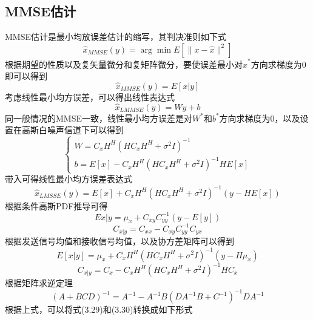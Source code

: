 \documentclass[bachelor,nocolorlinks, printoneside]{seuthesis} %
\begin{document}
\begin{Main}
\section{MMSE估计}
MMSE估计是最小均放误差估计的缩写，其判决准则如下式
\begin{equation}\label{key}
\hat{x}_{MMSE}(y) = \arg \min E[\| x - \hat{x} \|^{2}]
\end{equation}
根据期望的性质以及复矢量微分和复矩阵微分，要使误差最小对$\hat{x}^{*}$方向求梯度为0即可以得到
\begin{equation}\label{key}
\hat{x}_{MMSE}(y) = E[x|y]
\end{equation}
考虑线性最小均方误差，可以得出线性表达式
\begin{equation}\label{key}
\hat{x}_{LMMSE}(y)=Wy+b
\end{equation}
同一般情况的MMSE一致，线性最小均方误差是对$W^{*}$和$b^{*}$方向求梯度为0，以及设置在高斯白噪声信道下可以得到
\begin{equation}\label{key}
\left\{
\begin{array}{l}
W=C_{x}H^{H}(HC_{x}H^{H} + \sigma^{2}I)^{-1} \\
b=E[x] - C_{x}H^{H}(HC_{x}H^{H} + \sigma^{2}I)^{-1}HE[x]
\end{array}
\right.
\end{equation}
带入可得线性最小均方误差表达式
\begin{equation}\label{key}
\hat{x}_{LMSSE}(y)=E[x]+C_{x}H^{H}(HC_{x}H^{H}+\sigma^{2}I)^{-1}(y-HE[x])
\end{equation}
根据条件高斯PDF推导可得
\begin{equation}\label{key}
E{x|y}=\mu_{x}+C_{xy}C_{yy}^{-1}(y-E[y])
\end{equation}
\begin{equation}\label{key}
C_{x|y} = C_{xx} -C_{xy}C_{yy}^{-1}C_{yx}
\end{equation}
根据发送信号均值和接收信号均值，以及协方差矩阵可以得到
\begin{equation}\label{key}
E[x|y]=\mu_{x} + C_{x}H^{H}(HC_{x}H^{H}+\sigma^{2}I)^{-1}(y-H\mu_{x})
\end{equation}
\begin{equation}\label{key}
C_{x|y}=C_{x}-C_{x}H^{H}(HC_{x}H^{H}+\sigma^{2}I)^{-1}HC_{x}
\end{equation}
根据矩阵求逆定理
\begin{equation}\label{key}
(A + BCD)^{-1} = A^{-1} - A^{-1}B(DA^{-1}B+C^{-1})^{-1}DA^{-1}
\end{equation}
根据上式，可以将式(3.29)和(3.30)转换成如下形式

\end{Main}
\end{document}
